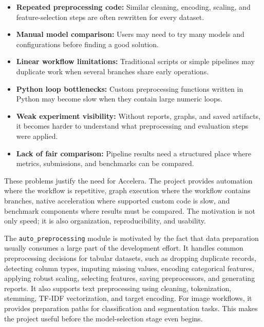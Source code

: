 \documentclass[12pt,a4paper]{report}
\begin{document}
\begin{itemize}
  \item \textbf{Repeated preprocessing code:} Similar cleaning, encoding,
  scaling, and feature-selection steps are often rewritten for every dataset.

  \item \textbf{Manual model comparison:} Users may need to try many models and
  configurations before finding a good solution.

  \item \textbf{Linear workflow limitations:} Traditional scripts or simple
  pipelines may duplicate work when several branches share early operations.

  \item \textbf{Python loop bottlenecks:} Custom preprocessing functions written
  in Python may become slow when they contain large numeric loops.

  \item \textbf{Weak experiment visibility:} Without reports, graphs, and saved
  artifacts, it becomes harder to understand what preprocessing and evaluation
  steps were applied.

  \item \textbf{Lack of fair comparison:} Pipeline results need a structured
  place where metrics, submissions, and benchmarks can be compared.
\end{itemize}

These problems justify the need for Accelera. The project provides automation
where the workflow is repetitive, graph execution where the workflow contains
branches, native acceleration where supported custom code is slow, and benchmark
components where results must be compared. The motivation is not only speed; it
is also organization, reproducibility, and usability.

The \texttt{auto\_preprocessing} module is motivated by the fact that data
preparation usually consumes a large part of the development effort. It handles
common preprocessing decisions for tabular datasets, such as dropping duplicate
records, detecting column types, imputing missing values, encoding categorical
features, applying robust scaling, selecting features, saving preprocessors, and
generating reports. It also supports text preprocessing using cleaning,
tokenization, stemming, TF-IDF vectorization, and target encoding. For image
workflows, it provides preparation paths for classification and segmentation
tasks. This makes the project useful before the model-selection stage even
begins.
\end{document}
